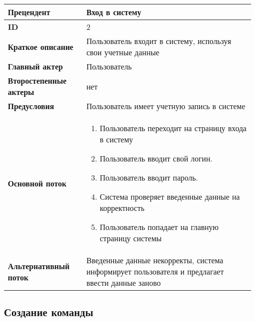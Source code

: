 \begin{tabular}{|l|p{9cm}|}
  \hline
  \textbf{Прецендент}            & Вход в систему                                                                                  \\
  \hline
  \textbf{ID}                    & 2                                                                                               \\
  \hline
  \textbf{Краткое описание}      & Пользователь входит в систему, используя свои учетные данные                                    \\
  \hline
  \textbf{Главный актер}         & Пользователь                                                                                    \\
  \hline
  \textbf{Второстепенные актеры} & нет                                                                                             \\
  \hline
  \textbf{Предусловия}           & Пользователь имеет учетную запись в системе                                                     \\
  \hline
  \textbf{Основной поток}        & \begin{enumerate}
                                     \item Пользователь переходит на страницу входа в систему
                                     \item Пользователь вводит свой логин.
                                     \item Пользователь вводит пароль.
                                     \item Система проверяет введенные данные на корректность
                                     \item Пользователь попадает на главную страницу системы
                                   \end{enumerate}                                         \\
  \hline
  \textbf{Альтернативный поток}  & Введенные данные некорректы, система информирует пользователя и предлагает ввести данные заново \\
  \hline
\end{tabular}

\subsection{Создание команды}

